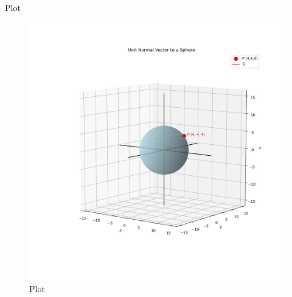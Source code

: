 \documentclass{beamer}
\begin{document}
\begin{frame}{Plot}
\begin{figure}[h!]
	\centering
	\includegraphics[width=0.5\columnwidth]{../figs/plot_c.jpg}
	\caption{Plot}
	\label{fig:fig}
\end{figure}
\end{frame}
\end{document}
